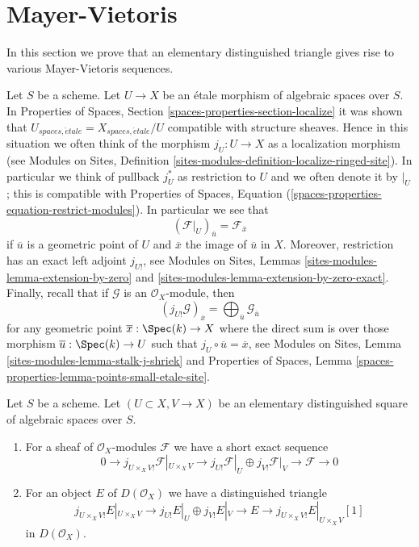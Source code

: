 \section{Mayer-Vietoris}
\label{section-mayer-vietoris}

\noindent
In this section we prove that an elementary distinguished triangle
gives rise to various Mayer-Vietoris sequences.

\medskip\noindent
Let $S$ be a scheme. Let $U \to X$ be an \'etale morphism of algebraic
spaces over $S$. In
Properties of Spaces, Section \ref{spaces-properties-section-localize}
it was shown that
$U_{spaces, \acute{e}tale} = X_{spaces, \acute{e}tale}/U$
compatible with structure sheaves. Hence in this situation we
often think of the morphism $j_U : U \to X$ as a localization morphism
(see Modules on Sites, Definition
\ref{sites-modules-definition-localize-ringed-site}).
In particular we think of pullback $j_U^*$ as restriction to $U$
and we often denote it by ${}|_U$; this is compatible with
Properties of Spaces, Equation
(\ref{spaces-properties-equation-restrict-modules}).
In particular we see that
\begin{equation}
\label{equation-stalk-restriction}
(\mathcal{F}|_U)_{\overline{u}} = \mathcal{F}_{\overline{x}}
\end{equation}
if $\overline{u}$ is a geometric point of $U$ and $\overline{x}$
the image of $\overline{u}$ in $X$.
Moreover, restriction has an exact left adjoint $j_{U!}$, see
Modules on Sites, Lemmas \ref{sites-modules-lemma-extension-by-zero} and
\ref{sites-modules-lemma-extension-by-zero-exact}.
Finally, recall that if $\mathcal{G}$ is an $\mathcal{O}_X$-module,
then
\begin{equation}
\label{equation-stalk-j-shriek}
(j_{U!}\mathcal{G})_{\overline{x}} =
\bigoplus\nolimits_{\overline{u}} \mathcal{G}_{\overline{u}}
\end{equation}
for any geometric point $\overline{x} : \Spec(k) \to X$ where the
direct sum is over those morphism $\overline{u} : \Spec(k) \to U$
such that $j_U \circ \overline{u} = \overline{x}$, see
Modules on Sites, Lemma \ref{sites-modules-lemma-stalk-j-shriek}
and
Properties of Spaces, Lemma
\ref{spaces-properties-lemma-points-small-etale-site}.

\begin{lemma}
\label{lemma-exact-sequence-lower-shriek}
Let $S$ be a scheme. Let $(U \subset X, V \to X)$ be an elementary
distinguished square of algebraic spaces over $S$.
\begin{enumerate}
\item For a sheaf of $\mathcal{O}_X$-modules $\mathcal{F}$
we have a short exact sequence
$$
0 \to j_{U \times_X V!}\mathcal{F}|_{U \times_X V} \to
j_{U!}\mathcal{F}|_U \oplus j_{V!}\mathcal{F}|_V \to \mathcal{F} \to 0
$$
\item For an object $E$ of $D(\mathcal{O}_X)$ we have a distinguished
triangle
$$
j_{U \times_X V!}E|_{U \times_X V} \to
j_{U!}E|_U \oplus j_{V!}E|_V \to E \to 
j_{U \times_X V!}E|_{U \times_X V}[1]
$$
in $D(\mathcal{O}_X)$.
\end{enumerate}
\end{lemma}

